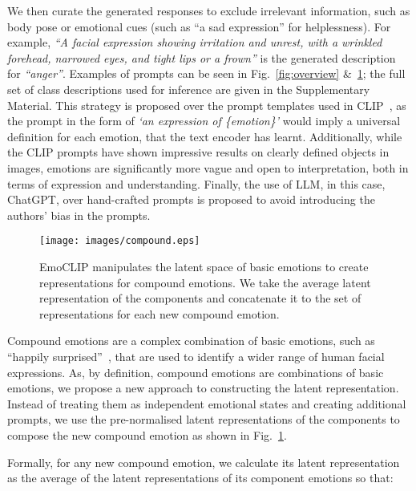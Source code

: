 \documentclass[10pt,twocolumn,letterpaper]{article}
\begin{document}
We then curate the generated responses to exclude irrelevant information, such as body pose or emotional cues (such as ``a sad expression'' for helplessness). For example, \textit{``A facial expression showing irritation and unrest, with a wrinkled forehead, narrowed eyes, and tight lips or a frown''} is the generated description for \textit{``anger''}. Examples of prompts can be seen in Fig.~\ref{fig:overview} \&~\ref{fig:compound}; the full set of class descriptions used for inference are given in the Supplementary Material. This strategy is proposed over the prompt templates used in CLIP~\cite{radford_CLIP_2021}, as the prompt in the form of \textit{`an expression of \{emotion\}'} would imply a universal definition for each emotion, that the text encoder has learnt. Additionally, while the CLIP prompts have shown impressive results on clearly defined objects in images, emotions are significantly more vague and open to interpretation, both in terms of expression and understanding. Finally, the use of LLM, in this case, ChatGPT, over hand-crafted prompts is proposed to avoid introducing the authors' bias in the prompts.

\label{sec:compound}
\begin{figure}
  \begin{center}
    \texttt{[image: images/compound.eps]}
  \end{center}
    \caption{EmoCLIP manipulates the latent space of basic emotions to create representations for compound emotions. We take the average latent representation of the components and concatenate it to the set of representations for each new compound emotion.}
  \label{fig:compound}
\end{figure}

Compound emotions are a complex combination of basic emotions, such as ``happily surprised''~\cite{cowen_self-report_2017, liu_mafw_2022}, that are used to identify a wider range of human facial expressions. As, by definition, compound emotions are combinations of basic emotions, we propose a new approach to constructing the latent  representation. Instead of treating them as independent emotional states and creating additional prompts, we use the pre-normalised latent representations of the components to compose the new compound emotion as shown in Fig.~\ref{fig:compound}. 

Formally, for any new compound emotion, we calculate its latent representation  as the average of the latent representations of its  component emotions so that: 
\end{document}
